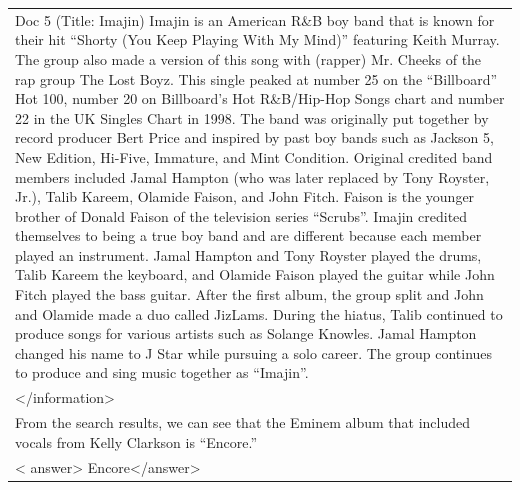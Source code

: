 \documentclass[11pt]{article}
\begin{document}
\begin{longtable}{|p{}|}
Doc 5 (Title: Imajin) Imajin is an American R\&B boy band that is known for their hit ``Shorty (You Keep Playing With My Mind)'' featuring Keith Murray. The group also made a version of this song with (rapper) Mr. Cheeks of the rap group The Lost Boyz. This single peaked at number 25 on the ``Billboard'' Hot 100, number 20 on Billboard's Hot R\&B/Hip-Hop Songs chart and number 22 in the UK Singles Chart in 1998. The band was originally put together by record producer Bert Price and inspired by past boy bands such as Jackson 5, New Edition, Hi-Five, Immature, and Mint Condition. Original credited band members included Jamal Hampton (who was later replaced by Tony Royster, Jr.), Talib Kareem, Olamide Faison, and John Fitch. Faison is the younger brother of Donald Faison of the television series ``Scrubs''. Imajin credited themselves to being a true boy band and are different because each member played an instrument. Jamal Hampton and Tony Royster played the drums, Talib Kareem the keyboard, and Olamide Faison played the guitar while John Fitch played the bass guitar. After the first album, the group split and John and Olamide made a duo called JizLams. During the hiatus, Talib continued to produce songs for various artists such as Solange Knowles. Jamal Hampton changed his name to J Star while pursuing a solo career. The group continues to produce and sing music together as ``Imajin''. \\
\textless{}/information\textgreater{} \\
\hline
From the search results, we can see that the Eminem album that included vocals from Kelly Clarkson is ``Encore.'' \\
\hline
\textless{} answer\textgreater{} Encore\textless{}/answer\textgreater{} \\
\end{longtable}
\end{document}
